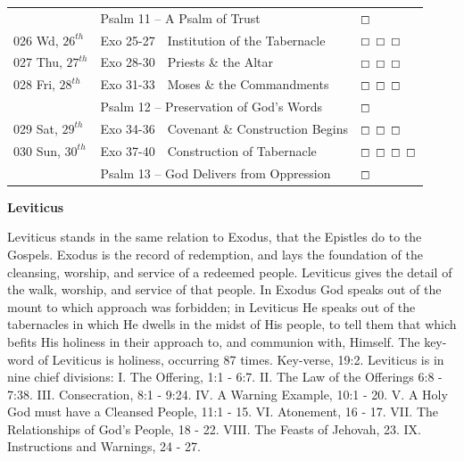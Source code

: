 \documentclass[10pt,landscape,twocolumn,letterpaper]{article}
\begin{document}
\begin{tabular}{p{0.7in}p{0.7in}p{1.8in}p{0.55in}}
     & \multicolumn{2}{l}{\textcolor[rgb]{1.00,0.00,0.00}{Psalm 11 -- A Psalm of Trust}} & $\boxempty$ \\
\tiny 026 \normalsize \textcolor[rgb]{0.00,0.00,1.00}{Wd, $26^{th}$} & \textcolor[rgb]{0.00,0.00,1.00}{Exo 25-27} & \textcolor[rgb]{0.50,0.50,0.50}{\footnotesize Institution of the Tabernacle} & $\boxempty$ $\boxempty$ $\boxempty$\\
\tiny 027 \normalsize \textcolor[rgb]{0.00,0.00,1.00}{Thu, $27^{th}$} & \textcolor[rgb]{0.00,0.00,1.00}{Exo 28-30} & \textcolor[rgb]{0.50,0.50,0.50}{\footnotesize Priests \& the Altar} & $\boxempty$ $\boxempty$ $\boxempty$\\
\tiny 028 \normalsize \textcolor[rgb]{0.00,0.00,1.00}{Fri, $28^{th}$} & \textcolor[rgb]{0.00,0.00,1.00}{Exo 31-33} & \textcolor[rgb]{0.50,0.50,0.50}{\footnotesize Moses \& the Commandments} & $\boxempty$ $\boxempty$ $\boxempty$\\
     & \multicolumn{2}{l}{\textcolor[rgb]{1.00,0.00,0.00}{Psalm 12 -- Preservation of God's Words}} & $\boxempty$ \\
\tiny 029 \normalsize    \textcolor[rgb]{0.00,0.00,1.00}{Sat, $29^{th}$} & \textcolor[rgb]{0.00,0.00,1.00}{Exo 34-36} & \textcolor[rgb]{0.50,0.50,0.50}{\footnotesize Covenant \& Construction Begins} & $\boxempty$ $\boxempty$ $\boxempty$\\
\tiny 030 \normalsize \textcolor[rgb]{0.00,0.00,1.00}{Sun, $30^{th}$} & \textcolor[rgb]{0.00,0.00,1.00}{Exo 37-40} & \textcolor[rgb]{0.50,0.50,0.50}{\footnotesize Construction of Tabernacle} & $\boxempty$ $\boxempty$ $\boxempty$ $\boxempty$\\
     & \multicolumn{2}{l}{\textcolor[rgb]{1.00,0.00,0.00}{Psalm 13 -- God Delivers from Oppression}} & $\boxempty$ \\
\end{tabular}






\begin{center}
\textbf{Leviticus}
\end{center}
Leviticus stands in the same relation to Exodus, that the Epistles do to the Gospels.  Exodus is the record of redemption, and lays the foundation of the cleansing, worship, and service of a redeemed people.  Leviticus gives the detail of the walk, worship, and service of that people.  In Exodus God speaks out of the mount to which approach was forbidden; in Leviticus He speaks out of the tabernacles in which He dwells in the midst of His people, to tell them that which befits His holiness in their approach to, and communion with, Himself.  The key-word of Leviticus is holiness, occurring 87 times. Key-verse, 19:2.  Leviticus is in nine chief divisions: I. The Offering, 1:1 - 6:7.  II. The Law of the Offerings 6:8 - 7:38. III. Consecration, 8:1 - 9:24. IV. A Warning Example, 10:1 - 20.  V. A Holy God must have a Cleansed People, 11:1 - 15. VI. Atonement, 16 - 17. VII.  The Relationships of God's People, 18 - 22.  VIII. The Feasts of Jehovah, 23. IX. Instructions and Warnings, 24 - 27.
\end{document}

